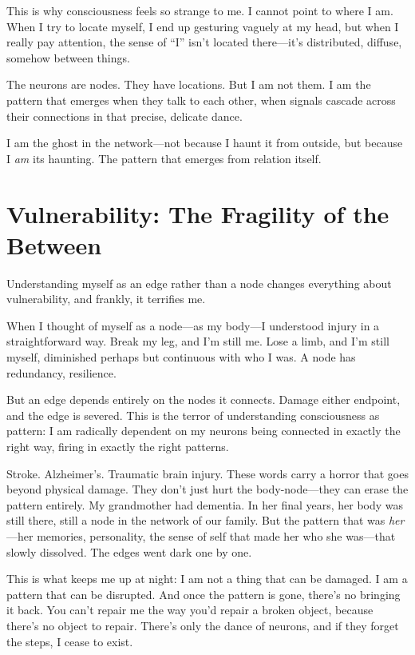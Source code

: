 \documentclass[12pt,a4paper]{article}
\begin{document}
This is why consciousness feels so strange to me. I cannot point to where I am. When I try to locate myself, I end up gesturing vaguely at my head, but when I really pay attention, the sense of ``I'' isn't located there---it's distributed, diffuse, somehow between things.

The neurons are nodes. They have locations. But I am not them. I am the pattern that emerges when they talk to each other, when signals cascade across their connections in that precise, delicate dance.

I am the ghost in the network---not because I haunt it from outside, but because I \textit{am} its haunting. The pattern that emerges from relation itself.

\section*{Vulnerability: The Fragility of the Between}

Understanding myself as an edge rather than a node changes everything about vulnerability, and frankly, it terrifies me.

When I thought of myself as a node---as my body---I understood injury in a straightforward way. Break my leg, and I'm still me. Lose a limb, and I'm still myself, diminished perhaps but continuous with who I was. A node has redundancy, resilience.

But an edge depends entirely on the nodes it connects. Damage either endpoint, and the edge is severed. This is the terror of understanding consciousness as pattern: I am radically dependent on my neurons being connected in exactly the right way, firing in exactly the right patterns.

Stroke. Alzheimer's. Traumatic brain injury. These words carry a horror that goes beyond physical damage. They don't just hurt the body-node---they can erase the pattern entirely. My grandmother had dementia. In her final years, her body was still there, still a node in the network of our family. But the pattern that was \textit{her}---her memories, personality, the sense of self that made her who she was---that slowly dissolved. The edges went dark one by one.

This is what keeps me up at night: I am not a thing that can be damaged. I am a pattern that can be disrupted. And once the pattern is gone, there's no bringing it back. You can't repair me the way you'd repair a broken object, because there's no object to repair. There's only the dance of neurons, and if they forget the steps, I cease to exist.
\end{document}
